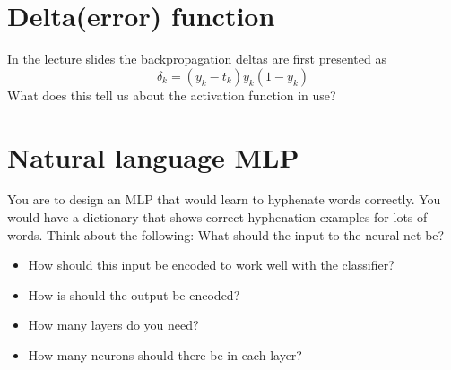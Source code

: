 \section{Delta(error) function}
In the lecture slides the backpropagation deltas are first presented as
\[
\delta_k = (y_k - t_k)y_k(1-y_k)
\]
What does this tell us about the activation function in use?

\section{Natural language MLP}
You are to design an MLP that would learn to hyphenate words correctly.
You would have a dictionary that shows correct hyphenation examples for lots of words.
Think about the following:
What should the input to the neural net be?
\begin{itemize}
    \item How should this input be encoded to work well with the classifier?
    \item How is should the output be encoded?
    \item How many layers do you need?
    \item How many neurons should there be in each layer?
\end{itemize}


